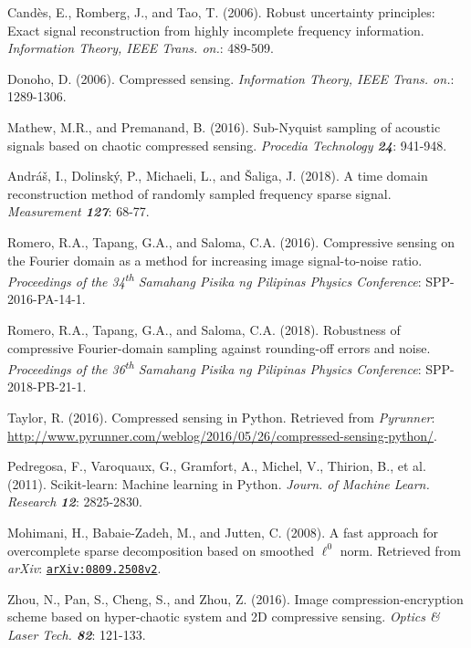 \documentclass[10pt,a4paper,twoside]{article}
\begin{document}
\clearpage

\begin{thebibliography}{1}
\label{sec:Ref}

Cand\`{e}s, E., Romberg, J., and Tao, T. (2006). Robust uncertainty principles: Exact signal reconstruction from highly incomplete frequency information. \textit{Information Theory, IEEE Trans. on.}: 489-509.

Donoho, D. (2006). Compressed sensing. \textit{Information Theory, IEEE Trans. on.}: 1289-1306.


Mathew, M.R., and Premanand, B. (2016). Sub-Nyquist sampling of acoustic signals based on chaotic compressed sensing. \textit{Procedia Technology \textbf{24}}: 941-948.

Andr\'{a}\v{s}, I., Dolinsk\'{y}, P., Michaeli, L., and \v{S}aliga, J. (2018). A time domain reconstruction method of randomly sampled frequency sparse signal. \textit{Measurement \textbf{127}}: 68-77.

Romero, R.A., Tapang, G.A., and Saloma, C.A. (2016). Compressive sensing on the Fourier domain as a method for increasing image signal-to-noise ratio. \textit{Proceedings of the 34\textsuperscript{th} Samahang Pisika ng Pilipinas Physics Conference}: SPP-2016-PA-14-1.

Romero, R.A., Tapang, G.A., and Saloma, C.A. (2018). Robustness of compressive Fourier-domain sampling against rounding-off errors and noise. \textit{Proceedings of the 36\textsuperscript{th} Samahang Pisika ng Pilipinas Physics Conference}: SPP-2018-PB-21-1.

Taylor, R. (2016). Compressed sensing in Python. Retrieved from \textit{Pyrunner}: \url{http://www.pyrunner.com/weblog/2016/05/26/compressed-sensing-python/}.

Pedregosa, F., Varoquaux, G., Gramfort, A., Michel, V., Thirion, B., et al. (2011). Scikit-learn: Machine learning in Python. \textit{Journ. of Machine Learn. Research \textbf{12}}: 2825-2830.

Mohimani, H., Babaie-Zadeh, M., and Jutten, C. (2008). A fast approach for overcomplete sparse decomposition based on smoothed $\ell^0$ norm. Retrieved from \textit{arXiv}: \texttt{\href{https://arxiv.org/abs/0809.2508v2}{arXiv:0809.2508v2}}.

Zhou, N., Pan, S., Cheng, S., and Zhou, Z. (2016). Image compression-encryption scheme based on hyper-chaotic system and 2D compressive sensing. \textit{Optics \& Laser Tech. \textbf{82}}: 121-133.

\end{thebibliography}
\end{document}
